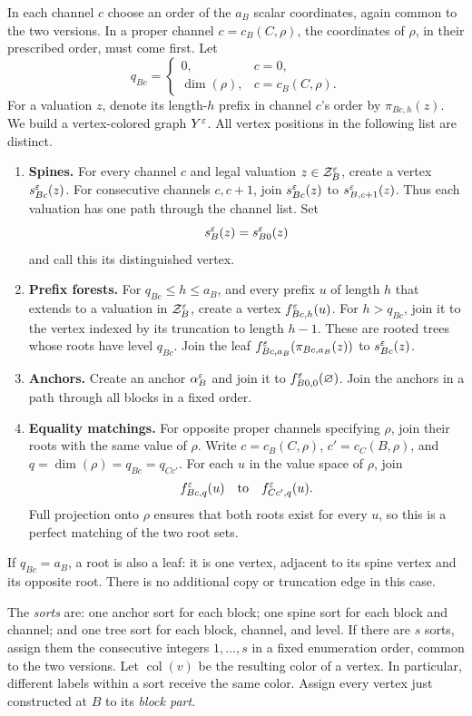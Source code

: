 In each channel \(c\) choose an order of the \(a_B\) scalar coordinates,
again common to the two versions.  In a proper channel
\(c=c_B(C,\rho)\), the coordinates of \(\rho\), in their prescribed
order, must come first.  Let
\[
 q_{Bc}=
 \begin{cases}
  0,&c=0,\\
  \dim(\rho),&c=c_B(C,\rho).
 \end{cases}
\]
For a valuation \(z\), denote its length-\(h\) prefix in channel \(c\)'s
order by \(\pi_{Bc,h}(z)\).
We build a vertex-colored graph \(Y^\varepsilon\).
All vertex positions in the following list are distinct.

\begin{enumerate}
\item
\textbf{Spines.}
For every channel \(c\) and legal valuation \(z\in\mathcal Z_B^\varepsilon\),
create a vertex \(s_{Bc}^\varepsilon(z)\).
For consecutive channels \(c,c+1\), join
\(s_{Bc}^\varepsilon(z)\) to \(s_{B,c+1}^\varepsilon(z)\).
Thus each valuation has one path through the channel list.
Set
\[
                  s_B^\varepsilon(z)=s_{B0}^\varepsilon(z)
\]
and call this its distinguished vertex.
\item
\textbf{Prefix forests.}
For \(q_{Bc}\le h\le a_B\), and every prefix \(u\) of length \(h\)
that extends to a valuation in \(\mathcal Z_B^\varepsilon\), create a vertex
\(f_{Bc,h}^\varepsilon(u)\).
For \(h>q_{Bc}\), join it to the vertex indexed by its truncation
to length \(h-1\).
These are rooted trees whose roots have level \(q_{Bc}\).
Join the leaf
\(f_{Bc,a_B}^\varepsilon(\pi_{Bc,a_B}(z))\)
to \(s_{Bc}^\varepsilon(z)\).
\item
\textbf{Anchors.}
Create an anchor \(\alpha_B^\varepsilon\) and join it to
\(f_{B0,0}^\varepsilon(\varnothing)\).
Join the anchors in a path through all blocks in a fixed order.
\item
\textbf{Equality matchings.}
For opposite proper channels specifying \(\rho\), join their roots
with the same value of \(\rho\).
Write \(c=c_B(C,\rho)\), \(c'=c_C(B,\rho)\), and
\(q=\dim(\rho)=q_{Bc}=q_{Cc'}\).
For each \(u\) in the value space of \(\rho\), join
\[
 f_{Bc,q}^\varepsilon(u)
 \quad\text{to}\quad
 f_{Cc',q}^\varepsilon(u).
\]
Full projection onto \(\rho\) ensures that both roots exist for every
\(u\), so this is a perfect matching of the two root sets.
\end{enumerate}

If \(q_{Bc}=a_B\), a root is also a leaf: it is one vertex, adjacent
to its spine vertex and its opposite root.
There is no additional copy or truncation edge in this case.

The \emph{sorts} are: one anchor sort for each block; one spine sort
for each block and channel; and one tree sort for each block, channel,
and level.  If there are \(s\) sorts, assign them the consecutive
integers \(1,\ldots,s\) in a fixed enumeration order, common to the
two versions.
Let \(\operatorname{col}(v)\) be the resulting color of a vertex.
In particular, different labels within a sort receive the same color.
Assign every vertex just constructed at \(B\) to its \emph{block part}.

